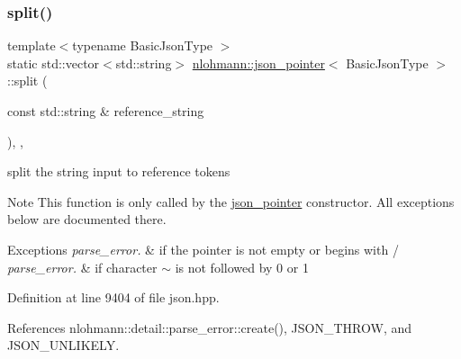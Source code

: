 \subsubsection{\texorpdfstring{split()}{split()}}
{\footnotesize\ttfamily template$<$typename Basic\+Json\+Type $>$ \\
static std\+::vector$<$std\+::string$>$ \hyperlink{classnlohmann_1_1json__pointer}{nlohmann\+::json\+\_\+pointer}$<$ Basic\+Json\+Type $>$\+::split (\begin{DoxyParamCaption}\item[{const std\+::string \&}]{reference\+\_\+string }\end{DoxyParamCaption})\hspace{0.3cm}{\ttfamily [inline]}, {\ttfamily [static]}, {\ttfamily [private]}}



split the string input to reference tokens 

\begin{DoxyNote}{Note}
This function is only called by the \hyperlink{classnlohmann_1_1json__pointer}{json\+\_\+pointer} constructor. All exceptions below are documented there.
\end{DoxyNote}

\begin{DoxyExceptions}{Exceptions}
{\em parse\+\_\+error.} & if the pointer is not empty or begins with \textquotesingle{}/\textquotesingle{} \\
\hline
{\em parse\+\_\+error.} & if character \textquotesingle{}$\sim$\textquotesingle{} is not followed by \textquotesingle{}0\textquotesingle{} or \textquotesingle{}1\textquotesingle{} \\
\hline
\end{DoxyExceptions}


Definition at line 9404 of file json.\+hpp.



References nlohmann\+::detail\+::parse\+\_\+error\+::create(), J\+S\+O\+N\+\_\+\+T\+H\+R\+OW, and J\+S\+O\+N\+\_\+\+U\+N\+L\+I\+K\+E\+LY.



